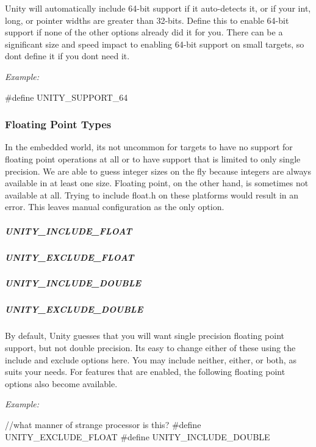 Unity will automatically include 64-\/bit support if it auto-\/detects it, or if your {\ttfamily int}, {\ttfamily long}, or pointer widths are greater than 32-\/bits. Define this to enable 64-\/bit support if none of the other options already did it for you. There can be a significant size and speed impact to enabling 64-\/bit support on small targets, so don\textquotesingle{}t define it if you don\textquotesingle{}t need it.

{\itshape Example\+:} 
\begin{DoxyCode}
\textcolor{preprocessor}{#define UNITY\_SUPPORT\_64}
\end{DoxyCode}


\subsubsection*{Floating Point Types}

In the embedded world, it\textquotesingle{}s not uncommon for targets to have no support for floating point operations at all or to have support that is limited to only single precision. We are able to guess integer sizes on the fly because integers are always available in at least one size. Floating point, on the other hand, is sometimes not available at all. Trying to include {\ttfamily float.\+h} on these platforms would result in an error. This leaves manual configuration as the only option.

\subparagraph*{{\ttfamily U\+N\+I\+T\+Y\+\_\+\+I\+N\+C\+L\+U\+D\+E\+\_\+\+F\+L\+O\+AT}}

\subparagraph*{{\ttfamily U\+N\+I\+T\+Y\+\_\+\+E\+X\+C\+L\+U\+D\+E\+\_\+\+F\+L\+O\+AT}}

\subparagraph*{{\ttfamily U\+N\+I\+T\+Y\+\_\+\+I\+N\+C\+L\+U\+D\+E\+\_\+\+D\+O\+U\+B\+LE}}

\subparagraph*{{\ttfamily U\+N\+I\+T\+Y\+\_\+\+E\+X\+C\+L\+U\+D\+E\+\_\+\+D\+O\+U\+B\+LE}}

By default, Unity guesses that you will want single precision floating point support, but not double precision. It\textquotesingle{}s easy to change either of these using the include and exclude options here. You may include neither, either, or both, as suits your needs. For features that are enabled, the following floating point options also become available.

{\itshape Example\+:} 
\begin{DoxyCode}
\textcolor{comment}{//what manner of strange processor is this?}
\textcolor{preprocessor}{#define UNITY\_EXCLUDE\_FLOAT}
\textcolor{preprocessor}{#define UNITY\_INCLUDE\_DOUBLE}
\end{DoxyCode}


